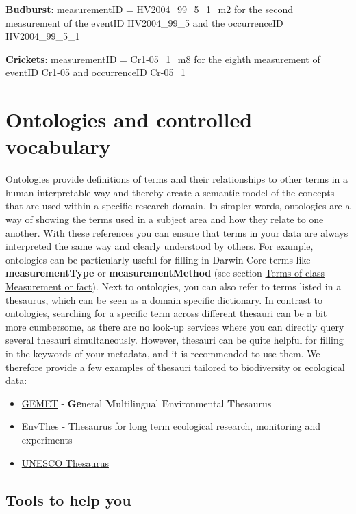 \documentclass[
]{book}
\begin{document}
\textbf{Budburst}: measurementID = HV2004\_99\_5\_1\_m2 for the second measurement of the eventID HV2004\_99\_5 and the occurrenceID HV2004\_99\_5\_1

\textbf{Crickets}: measurementID = Cr1-05\_1\_m8 for the eighth measurement of eventID Cr1-05 and occurrenceID Cr-05\_1

\hypertarget{ontologies}{%
\section{Ontologies and controlled vocabulary}\label{ontologies}}

Ontologies provide definitions of terms and their relationships to other terms in a human-interpretable way and thereby create a semantic model of the concepts that are used within a specific research domain. In simpler words, ontologies are a way of showing the terms used in a subject area and how they relate to one another. With these references you can ensure that terms in your data are always interpreted the same way and clearly understood by others. For example, ontologies can be particularly useful for filling in Darwin Core terms like \textbf{measurementType} or \textbf{measurementMethod} (see section \protect\hyperlink{mof}{Terms of class Measurement or fact}). Next to ontologies, you can also refer to terms listed in a thesaurus, which can be seen as a domain specific dictionary. In contrast to ontologies, searching for a specific term across different thesauri can be a bit more cumbersome, as there are no look-up services where you can directly query several thesauri simultaneously. However, thesauri can be quite helpful for filling in the keywords of your metadata, and it is recommended to use them. We therefore provide a few examples of thesauri tailored to biodiversity or ecological data:

\begin{itemize}
\item
  \href{https://www.eionet.europa.eu/gemet/en/themes/}{GEMET} - \textbf{Ge}neral \textbf{M}ultilingual \textbf{E}nvironmental \textbf{T}hesaurus
\item
  \href{https://vocabs.lter-europe.net/envthes/en/}{EnvThes} - Thesaurus for long term ecological research, monitoring and experiments
\item
  \href{https://vocabularies.unesco.org/browser/thesaurus/en/}{UNESCO Thesaurus}
\end{itemize}

\hypertarget{tools-to-help-you-2}{%
\subsection{Tools to help you}\label{tools-to-help-you-2}}
\end{document}
